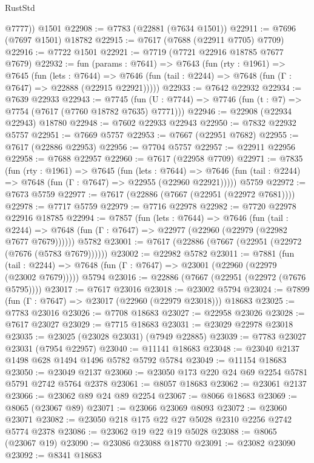 \begin{lexlean}{RustStd}
\begin{coremodule}
        @7777))
    @1501
@22908 := @7783 (@22881 (@7634 @1501))
@22911 := @7696 (@7697 @1501) @18782
@22915 := @7617 (@7688 (@22911 @7705) @7709)
@22916 := @7722 @1501
@22921 := @7719 (@7721 @22916 @18785 @7677 @7679)
@22932 := fun (params : @7641) =>
  @7643
    (fun (rty : @1961) =>
    @7645
      (fun (lets : @7644) =>
      @7646 (fun (tail : @2244) => @7648 (fun (Γ : @7647) => @22888 (@22915 @22921)))))
@22933 := @7642 @22932
@22934 := @7639 @22933
@22943 := @7745
    (fun (U : @7744) => @7746 (fun (t : @7) => @7754 (@7617 (@7760 @18782 @7635) @7771)))
@22946 := @22908 (@22934 @22943) @18780
@22948 := @7602 @22933 @22943
@22950 := @7832 @22932 @5757
@22951 := @7669 @5757
@22953 := @7667 (@22951 @7682)
@22955 := @7617 (@22886 @22953)
@22956 := @7704 @5757
@22957 := @22911 @22956
@22958 := @7688 @22957
@22960 := @7617 (@22958 @7709)
@22971 := @7835
    (fun (rty : @1961) =>
    @7645
      (fun (lets : @7644) =>
      @7646 (fun (tail : @2244) => @7648 (fun (Γ : @7647) => @22955 (@22960 @22921)))))
    @5759
@22972 := @7673 @5759
@22977 := @7617 (@22886 (@7667 (@22951 (@22972 @7681))))
@22978 := @7717 @5759
@22979 := @7716 @22978
@22982 := @7720 @22978 @22916 @18785
@22994 := @7857
    (fun (lets : @7644) =>
    @7646
      (fun (tail : @2244) =>
      @7648 (fun (Γ : @7647) => @22977 (@22960 (@22979 (@22982 @7677 @7679))))))
    @5782
@23001 := @7617 (@22886 (@7667 (@22951 (@22972 (@7676 (@5783 @7679))))))
@23002 := @22982 @5782
@23011 := @7881
    (fun (tail : @2244) => @7648 (fun (Γ : @7647) => @23001 (@22960 (@22979 (@23002 @7679)))))
    @5794
@23016 := @22886 (@7667 (@22951 (@22972 (@7676 @5795))))
@23017 := @7617 @23016
@23018 := @23002 @5794
@23024 := @7899 (fun (Γ : @7647) => @23017 (@22960 (@22979 @23018))) @18683
@23025 := @7783 @23016
@23026 := @7708 @18683
@23027 := @22958 @23026
@23028 := @7617 @23027
@23029 := @7715 @18683
@23031 := @23029 @22978 @23018
@23035 := @23025 (@23028 @23031) (@7949 @22885)
@23039 := @7783 @23027 @23031 (@7954 @22957)
@23040 := @11141 @18683
@23048 := @23040 @2137 @1498 @628 @1494 @1496 @5782 @5792 @5784
@23049 := @11154 @18683
@23050 := @23049 @2137
@23060 := @23050 @173 @220 @24 @69 @2254 @5781 @5791 @2742 @5764 @2378
@23061 := @8057 @18683
@23062 := @23061 @2137
@23066 := @23062 @89 @24 @89 @2254
@23067 := @8066 @18683
@23069 := @8065 (@23067 @89)
@23071 := @23066 @23069 @8093
@23072 := @23060 @23071
@23082 := @23050 @218 @175 @22 @27 @5028 @2310 @2256 @2742 @5774 @2378
@23086 := @23062 @19 @22 @19 @5028
@23088 := @8065 (@23067 @19)
@23090 := @23086 @23088 @18770
@23091 := @23082 @23090
@23092 := @8341 @18683

\end{coremodule}
\end{lexlean}
